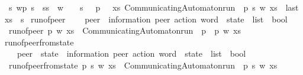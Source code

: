\begin{isabellebody}
\ \ {\isachardoublequoteopen}s{}\ {\isasymmidarrow}w{\isasymrightarrow}\isactrlsup {\isacharasterisk}{\kern0pt}p\ s{}\ {\isasymequiv}\ {\isacharparenleft}{\kern0pt}s{}{\isacharequal}{\kern0pt}s{}\ {\isasymand}\ w\ {\isacharequal}{\kern0pt}\ {\isasymepsilon}\ {\isasymand}\ s{}\ {\isasymin}\ {\isasymS}\ p{\isacharparenright}{\kern0pt}\ \ {\isasymor}\ {\isacharparenleft}{\kern0pt}{\isasymexists}xs{\isachardot}{\kern0pt}\ CommunicatingAutomaton{\isachardot}{\kern0pt}run\ {\isacharparenleft}{\kern0pt}{\isasymR}\ p{\isacharparenright}{\kern0pt}\ s{}\ w\ xs\ {\isasymand}\ last\ xs\ {\isacharequal}{\kern0pt}\ s{}{\isacharparenright}{\kern0pt}{\isachardoublequoteclose}\isanewline
\isanewline
{}\isamarkupfalse%
\ run{\isacharunderscore}{\kern0pt}of{\isacharunderscore}{\kern0pt}peer\isanewline
\ \ {\isacharcolon}{\kern0pt}{\isacharcolon}{\kern0pt}\ {\isachardoublequoteopen}\ {\isacharprime}{\kern0pt}peer\ {\isasymRightarrow}\ {\isacharparenleft}{\kern0pt}{\isacharprime}{\kern0pt}information{\isacharcomma}{\kern0pt}\ {\isacharprime}{\kern0pt}peer{\isacharparenright}{\kern0pt}\ action\ word\ {\isasymRightarrow}\ {\isacharprime}{\kern0pt}state\ \ list\ {\isasymRightarrow}\ bool{\isachardoublequoteclose}\ \isanewline
\ \ {\isachardoublequoteopen}run{\isacharunderscore}{\kern0pt}of{\isacharunderscore}{\kern0pt}peer\ p\ w\ xs\ {\isasymequiv}\ {\isacharparenleft}{\kern0pt}CommunicatingAutomaton{\isachardot}{\kern0pt}run\ {\isacharparenleft}{\kern0pt}{\isasymR}\ p{\isacharparenright}{\kern0pt}\ {\isacharparenleft}{\kern0pt}{\isasymI}\ p{\isacharparenright}{\kern0pt}\ w\ xs{\isacharparenright}{\kern0pt}{\isachardoublequoteclose}\isanewline
\isanewline
{}\isamarkupfalse%
\ run{\isacharunderscore}{\kern0pt}of{\isacharunderscore}{\kern0pt}peer{\isacharunderscore}{\kern0pt}from{\isacharunderscore}{\kern0pt}state\isanewline
\ \ {\isacharcolon}{\kern0pt}{\isacharcolon}{\kern0pt}\ {\isachardoublequoteopen}\ {\isacharprime}{\kern0pt}peer\ {\isasymRightarrow}\ {\isacharprime}{\kern0pt}state\ {\isasymRightarrow}\ {\isacharparenleft}{\kern0pt}{\isacharprime}{\kern0pt}information{\isacharcomma}{\kern0pt}\ {\isacharprime}{\kern0pt}peer{\isacharparenright}{\kern0pt}\ action\ word\ {\isasymRightarrow}\ {\isacharprime}{\kern0pt}state\ \ list\ {\isasymRightarrow}\ bool{\isachardoublequoteclose}\ \isanewline
\ \ {\isachardoublequoteopen}run{\isacharunderscore}{\kern0pt}of{\isacharunderscore}{\kern0pt}peer{\isacharunderscore}{\kern0pt}from{\isacharunderscore}{\kern0pt}state\ p\ s\ w\ xs\ {\isasymequiv}\ {\isacharparenleft}{\kern0pt}CommunicatingAutomaton{\isachardot}{\kern0pt}run\ {\isacharparenleft}{\kern0pt}{\isasymR}\ p{\isacharparenright}{\kern0pt}\ s\ w\ xs{\isacharparenright}{\kern0pt}{\isachardoublequoteclose}\isanewline

\end{isabellebody}
